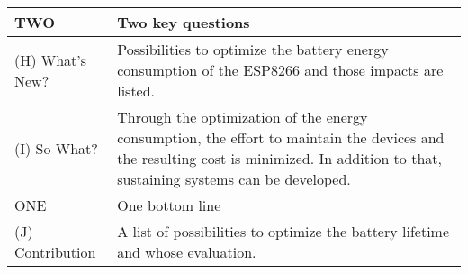 \documentclass[10pt,table]{article}
\providecommand{\lgc}{\cellcolor{lightgray}}
\begin{document}
\begin{center}
\begin{longtable}{p{4.5cm}p{4cm}p{2.5cm}p{4cm}p{2.5cm}p{3.5cm}}
		\midrule
		\lgc  TWO                        & \multicolumn{5}{p{18cm}}{\lgc Two key questions}                                                                                                                                                                                                                                                                                                                                                                                                                                                                                \\
		\midrule
		\lgc (H) What’s New?             & \multicolumn{5}{p{18cm}}{Possibilities to optimize the battery energy consumption of the ESP8266 and those impacts are listed.}                                                                                                                                                                                                                                                                                                                                                                                                 \\[1ex]
		\lgc (I) So What?                & \multicolumn{5}{p{18cm}}{Through the optimization of the energy consumption, the effort to maintain the devices and the resulting cost is minimized. In addition to that, sustaining systems can be developed.}                                                                                                                                                                                                                                                                                                                 \\[1ex]
		\midrule
		\lgc ONE                         & \multicolumn{5}{p{18cm}}{\lgc One bottom line}                                                                                                                                                                                                                                                                                                                                                                                                                                                                                  \\
		\midrule
		\lgc  (J) Contribution           & \multicolumn{5}{p{18cm}}{A list of possibilities to optimize the battery lifetime and whose evaluation.}                                                                                                                                                                                                                                                                                                                                                                                                                        \\[1ex]

\end{longtable}
\end{center}
\end{document}
